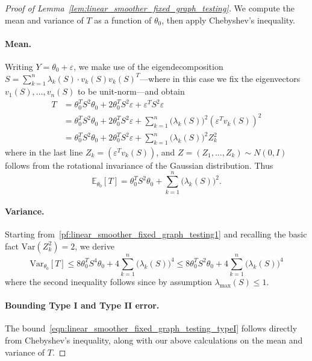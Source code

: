 \documentclass{article}
\newcommand{\Var}{\mathrm{Var}}
\newcommand{\1}{\mathbf{1}}
\newcommand{\Id}{I}
\newcommand{\Ebb}{\mathbb{E}}
\theoremstyle{alden}
\theoremstyle{aldenthm}
\theoremstyle{definition}
\theoremstyle{remark}
\begin{document}
\begin{proof}[Proof of Lemma~\ref{lem:linear_smoother_fixed_graph_testing}]
	We compute the mean and variance of $T$ as a function of $\theta_0$, then apply Chebyshev's inequality.
	\paragraph{Mean.}
	Writing $Y = \theta_0 + \varepsilon$, we make use of the eigendecomposition $S = \sum_{k = 1}^{n} \lambda_k(S) \cdot v_k(S) v_k(S)^T$---where in this case we fix the eigenvectors $v_1(S),\ldots,v_n(S)$ to be unit-norm---and obtain
	\begin{equation}
	\label{pf:linear_smoother_fixed_graph_testing1}
	\begin{aligned}
	T & = \theta_0^T S^2 \theta_0 + 2 \theta_0^T S^2 \varepsilon + \varepsilon^T S^2 \varepsilon \\
	& = \theta_0^T S^2 \theta_0 + 2 \theta_0^T S^2 \varepsilon + \sum_{k = 1}^{n}  \bigl(\lambda_k(S)\bigr)^2 (\varepsilon^T v_k(S))^2 \\
	& = \theta_0^T S^2 \theta_0 + 2 \theta_0^T S^2 \varepsilon + \sum_{k = 1}^{n}  \bigl(\lambda_k(S)\bigr)^2 Z_k^2
	\end{aligned}
	\end{equation}
	where in the last line $Z_k = (\varepsilon^T v_k(S))$, and $Z = (Z_1,\ldots,Z_k) \sim N(0,\Id)$ follows from the rotational invariance of the Gaussian distribution. Thus
	\begin{equation}
	\label{pf:linear_smoother_fixed_graph_testing_mean}
	\Ebb_{\theta_0}[T] = \theta_0^T S^2 \theta_0 + \sum_{k = 1}^{n} \bigl(\lambda_k(S)\bigr)^2.
	\end{equation}
	\paragraph{Variance.}  
	Starting from~\eqref{pf:linear_smoother_fixed_graph_testing1} and recalling the basic fact $\Var(Z_k^2) = 2$, we derive
	\begin{equation}
	\label{pf:linear_smoother_fixed_graph_testing_var}
	\Var_{\theta_0}[T] \leq 8 \theta_0^T S^4 \theta_0 + 4 \sum_{k = 1}^{n} \bigl(\lambda_k(S)\bigr)^4 \leq 8 \theta_0^T S^2 \theta_0 + 4 \sum_{k = 1}^{n} \bigl(\lambda_k(S)\bigr)^4
	\end{equation}
	where the second inequality follows since by assumption $\lambda_{\max}(S) \leq 1$.
	
	\paragraph{Bounding Type I and Type II error.}
	The bound~\eqref{eqn:linear_smoother_fixed_graph_testing_typeI} follows directly from Chebyshev's inequality, along with our above calculations on the mean and variance of $T$.
	

\end{proof}
\end{document}
